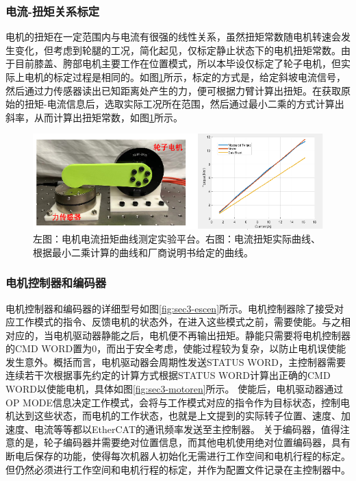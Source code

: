 \subsubsection{电流-扭矩关系标定}
电机的扭矩在一定范围内与电流有很强的线性关系，虽然扭矩常数随电机转速会发生变化，但考虑到轮腿的工况，简化起见，仅标定静止状态下的电机扭矩常数。由于目前膝盖、胯部电机主要工作在位置模式，所以本毕设仅标定了轮子电机，但实际上电机的标定过程是相同的。如图\ref{fig:sec3-tauIplot}所示，标定的方式是，给定斜坡电流信号，然后通过力传感器读出已知距离处产生的力，便可根据力臂计算出扭矩。在获取原始的扭矩-电流信息后，选取实际工况所在范围，然后通过最小二乘的方式计算出斜率，从而计算出扭矩常数，如图\ref{fig:sec3-tauIplot}所示。

\begin{figure}
  \centering
  \includegraphics[width=0.85\linewidth]{figures/Sec3/tauIplot.png}
  \caption{
  左图：电机电流扭矩曲线测定实验平台。右图：电流扭矩实际曲线、根据最小二乘计算的曲线和厂商说明书给定的曲线。
  }
  \label{fig:sec3-tauIplot}
   \vspace{6pt}
\end{figure}

\subsubsection{电机控制器和编码器}
电机控制器和编码器的详细型号如图\ref{fig:sec3-escen}所示。电机控制器除了接受对应工作模式的指令、反馈电机的状态外，在进入这些模式之前，需要使能。与之相对应的，当电机驱动器静能之后，电机便不再输出扭矩。静能只需要将电机控制器的CMD WORD置为0，而出于安全考虑，使能过程较为复杂，以防止电机误使能发生意外。概括而言，电机驱动器会周期性发送STATUS WORD，主控制器需要连续若干次根据事先约定的计算方式根据STATUS WORD计算出正确的CMD WORD以使能电机，具体如图\ref{fig:sec3-motoren}所示。
使能后，电机驱动器通过OP MODE信息决定工作模式，会将与工作模式对应的指令作为目标状态，控制电机达到这些状态，而电机的工作状态，也就是上文提到的实际转子位置、速度、加速度、电流等等都以EtherCAT的通讯频率发送至主控制器。
关于编码器，值得注意的是，轮子编码器并需要绝对位置信息，而其他电机使用绝对位置编码器，具有断电后保存的功能，使得每次机器人初始化无需进行工作空间和电机行程的标定。但仍然必须进行工作空间和电机行程的标定，并作为配置文件记录在主控制器中。

